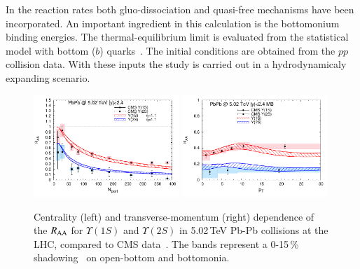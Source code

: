 {{In the reaction rates  both gluo-dissociation and quasi-free mechanisms have been incorporated.  An important 
ingredient in this calculation is the bottomonium binding energies. 
The thermal-equilibrium limit is evaluated from the statistical model with bottom ($b$) quarks~\cite{Grandchamp:2002wp}. 
The initial conditions are obtained from the $pp$ collision data. With these inputs the study is carried out in a hydrodynamicaly 
expanding scenario.  





\begin{figure}[t]
\includegraphics[width=0.49\textwidth]{Figures/fig3_rapp.pdf}
\includegraphics[width=0.49\textwidth]{Figures/fig4_rapp.pdf}
\caption{Centrality (left) and transverse-momentum (right) dependence of the $R_{\rm AA}$ for $\Upsilon(1S)$ and $\Upsilon(2S)$ in 5.02\,TeV Pb-Pb collisions at the LHC, compared to CMS data~\cite{Flores:2017qmcms}. The bands represent a 0-15\,\% shadowing~\cite{Eskola:2009uj} on open-bottom and bottomonia.}
\label{fig_cms}
\end{figure}

}}
